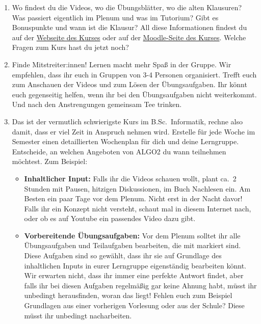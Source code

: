 \documentclass{uebung_cs}
\begin{document}
\begin{exercise}
  \begin{enumerate}
    \item Wo findest du die Videos, wo die Übungsblätter, wo die alten Klausuren?
    Was passiert eigentlich im Plenum und was im Tutorium?
    Gibt es Bonuspunkte und wann ist die Klausur?
    All diese Informationen findest du auf der \href{https://tcs.uni-frankfurt.de/algo2/}{Webseite des Kurses} oder auf der \href{https://moodle.studiumdigitale.uni-frankfurt.de/moodle/course/view.php?id=5636}{Moodle-Seite des Kurses}.
    Welche Fragen zum Kurs hast du jetzt noch? 
    \item Finde Mitstreiter:innen! Lernen macht mehr Spaß in der Gruppe. Wir empfehlen, dass ihr euch in Gruppen von 3-4 Personen organisiert. Trefft euch zum Anschauen der Videos und zum Lösen der Übungsaufgaben. Ihr könnt euch gegenseitig helfen, wenn ihr bei den Übungsaufgaben nicht weiterkommt. Und nach den Anstrengungen gemeinsam Tee trinken.
    \item Das ist der vermutlich schwierigste Kurs im B.Sc.~Informatik, rechne also damit, dass er viel Zeit in Anspruch nehmen wird.
    Erstelle für jede Woche im Semester einen detaillierten Wochenplan für dich und deine Lerngruppe. Entscheide, an welchen Angeboten von ALGO2 du wann teilnehmen möchtest. Zum Beispiel:
    \begin{itemize}
      \item\textbf{Inhaltlicher Input:} Falls ihr die Videos schauen wollt, plant ca.~2 Stunden mit Pausen, hitzigen Diskussionen, im Buch Nachlesen ein. Am Besten ein paar Tage vor dem Plenum. Nicht erst in der Nacht davor! Falls ihr ein Konzept nicht versteht, schaut mal in diesem Internet nach, oder ob es auf Youtube ein passendes Video dazu gibt.
      \item\textbf{Vorbereitende Übungsaufgaben:} Vor dem Plenum solltet ihr alle Übungsaufgaben und Teilaufgaben bearbeiten, die mit \intro markiert sind. Diese Aufgaben sind so gewählt, dass ihr sie auf Grundlage des inhaltlichen Inputs in eurer Lerngruppe eigenständig bearbeiten könnt. Wir erwarten nicht, dass ihr immer eine perfekte Antwort findet, aber falls ihr bei diesen Aufgaben regelmäßig gar keine Ahnung habt, müsst ihr unbedingt herausfinden, woran das liegt! Fehlen euch zum Beispiel Grundlagen aus einer vorherigen Vorlesung oder aus der Schule? Diese müsst ihr unbedingt nacharbeiten.

\end{itemize}
\end{enumerate}
\end{exercise}
\end{document}
